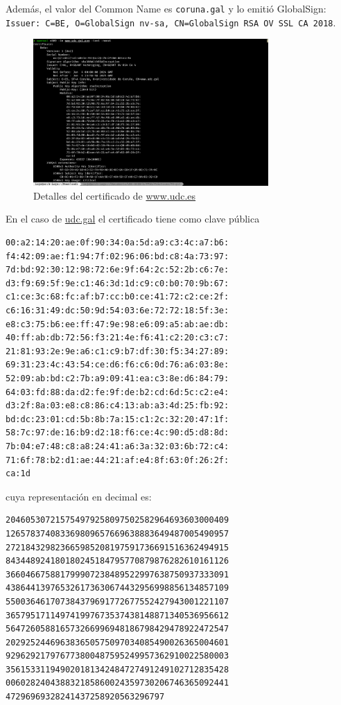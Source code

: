 Además, el valor del Common Name es \texttt{coruna.gal} y lo emitió GlobalSign: \texttt{Issuer: C=BE, O=GlobalSign nv-sa, CN=GlobalSign RSA OV SSL CA 2018}.

\begin{figure}[H]
    \centering
    \includegraphics[width=0.8\textwidth]{openssl-udc.png}
    \caption{Detalles del certificado de \url{www.udc.es}}
\end{figure}

En el caso de \url{udc.gal} el certificado tiene como clave pública

\begin{verbatim}
00:a2:14:20:ae:0f:90:34:0a:5d:a9:c3:4c:a7:b6:
f4:42:09:ae:f1:94:7f:02:96:06:bd:c8:4a:73:97:
7d:bd:92:30:12:98:72:6e:9f:64:2c:52:2b:c6:7e:
d3:f9:69:5f:9e:c1:46:3d:1d:c9:c0:b0:70:9b:67:
c1:ce:3c:68:fc:af:b7:cc:b0:ce:41:72:c2:ce:2f:
c6:16:31:49:dc:50:9d:54:03:6e:72:72:18:5f:3e:
e8:c3:75:b6:ee:ff:47:9e:98:e6:09:a5:ab:ae:db:
40:ff:ab:db:72:56:f3:21:4e:f6:41:c2:20:c3:c7:
21:81:93:2e:9e:a6:c1:c9:b7:df:30:f5:34:27:89:
69:31:23:4c:43:54:ce:d6:f6:c6:0d:76:a6:03:8e:
52:09:ab:bd:c2:7b:a9:09:41:ea:c3:8e:d6:84:79:
64:03:fd:88:da:d2:fe:9f:de:b2:cd:6d:5c:c2:e4:
d3:2f:8a:03:e8:c8:86:c4:13:ab:a3:4d:25:fb:92:
bd:dc:23:01:cd:5b:8b:7a:15:c1:2c:32:20:47:1f:
58:7c:97:de:16:b9:d2:18:f6:ce:4c:90:d5:d8:8d:
7b:04:e7:48:c8:a8:24:41:a6:3a:32:03:6b:72:c4:
71:6f:78:b2:d1:ae:44:21:af:e4:8f:63:0f:26:2f:
ca:1d
\end{verbatim}

cuya representación en decimal es:

\begin{verbatim}
204605307215754979258097502582964693603000409
126578374083369809657669638883649487005490957
272184329823665985208197591736691516362494915
843448924180180245184795770879876282610161126
366046675881799907238489522997638750937333091
438644139765326173630674432956998856134857109
550036461707384379691772677552427943001221107
365795171149741997673537438148871340536956612
564726058816573266996948186798429478922472547
202925244696383650575097034085490026365004601
929629217976773800487595249957362910022580003
356153311949020181342484727491249102712835428
006028240438832185860024359730206746365092441
47296969328241437258920563296797
\end{verbatim}


